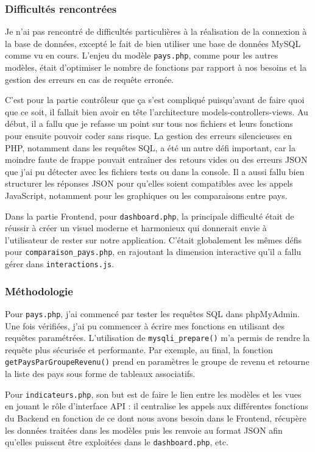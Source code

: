 \documentclass[11pt]{article}
\begin{document}
\subsubsection*{Difficultés rencontrées}
Je n’ai pas rencontré de difficultés particulières à la réalisation de la connexion à la base de données, excepté le fait de bien utiliser une base de données MySQL comme vu en cours. L’enjeu du modèle \texttt{pays.php}, comme pour les autres modèles, était d’optimiser le nombre de fonctions par rapport à nos besoins et la gestion des erreurs en cas de requête erronée.

C’est pour la partie contrôleur que ça s’est compliqué puisqu’avant de faire quoi que ce soit, il fallait bien avoir en tête l’architecture models-controllers-views. Au début, il a fallu que je refasse un point sur tous nos fichiers et leurs fonctions pour ensuite pouvoir coder sans risque. La gestion des erreurs silencieuses en PHP, notamment dans les requêtes SQL, a été un autre défi important, car la moindre faute de frappe pouvait entraîner des retours vides ou des erreurs JSON que j’ai pu détecter avec les fichiers tests ou dans la console. Il a aussi fallu bien structurer les réponses JSON pour qu’elles soient compatibles avec les appels JavaScript, notamment pour les graphiques ou les comparaisons entre pays.

Dans la partie Frontend, pour \texttt{dashboard.php}, la principale difficulté était de réussir à créer un visuel moderne et harmonieux qui donnerait envie à l’utilisateur de rester sur notre application. C’était globalement les mêmes défis pour \texttt{comparaison\_pays.php}, en rajoutant la dimension interactive qu’il a fallu gérer dans \texttt{interactions.js}.

\subsubsection*{Méthodologie}
Pour \texttt{pays.php}, j’ai commencé par tester les requêtes SQL dans phpMyAdmin. Une fois vérifiées, j’ai pu commencer à écrire mes fonctions en utilisant des requêtes paramétrées. L’utilisation de \texttt{mysqli\_prepare()} m’a permis de rendre la requête plus sécurisée et performante. Par exemple, au final, la fonction \texttt{getPaysParGroupeRevenu()} prend en paramètres le groupe de revenu et retourne la liste des pays sous forme de tableaux associatifs.

Pour \texttt{indicateurs.php}, son but est de faire le lien entre les modèles et les vues en jouant le rôle d’interface API : il centralise les appels aux différentes fonctions du Backend en fonction de ce dont nous avons besoin dans le Frontend, récupère les données traitées dans les modèles puis les renvoie au format JSON afin qu’elles puissent être exploitées dans le \texttt{dashboard.php}, etc.
\end{document}
